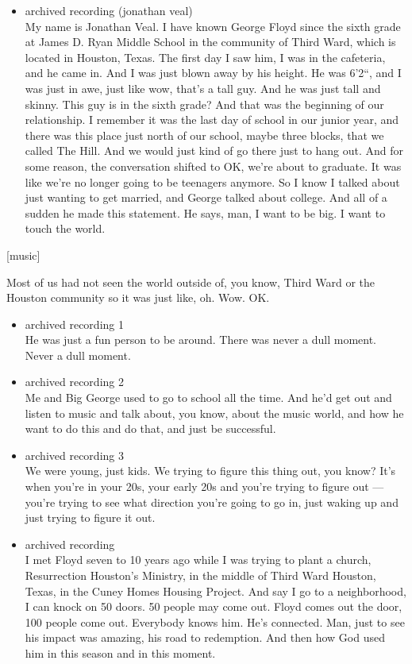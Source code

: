 \begin{itemize}
\tightlist
\item
  archived recording (jonathan veal)\\
  My name is Jonathan Veal. I have known George Floyd since the sixth
  grade at James D. Ryan Middle School in the community of Third Ward,
  which is located in Houston, Texas. The first day I saw him, I was in
  the cafeteria, and he came in. And I was just blown away by his
  height. He was 6'2``, and I was just in awe, just like wow, that's a
  tall guy. And he was just tall and skinny. This guy is in the sixth
  grade? And that was the beginning of our relationship. I remember it
  was the last day of school in our junior year, and there was this
  place just north of our school, maybe three blocks, that we called The
  Hill. And we would just kind of go there just to hang out. And for
  some reason, the conversation shifted to OK, we're about to graduate.
  It was like we're no longer going to be teenagers anymore. So I know I
  talked about just wanting to get married, and George talked about
  college. And all of a sudden he made this statement. He says, man, I
  want to be big. I want to touch the world.
\end{itemize}

{[}music{]}

Most of us had not seen the world outside of, you know, Third Ward or
the Houston community so it was just like, oh. Wow. OK.

\begin{itemize}
\item
  archived recording 1\\
  He was just a fun person to be around. There was never a dull moment.
  Never a dull moment.
\item
  archived recording 2\\
  Me and Big George used to go to school all the time. And he'd get out
  and listen to music and talk about, you know, about the music world,
  and how he want to do this and do that, and just be successful.
\item
  archived recording 3\\
  We were young, just kids. We trying to figure this thing out, you
  know? It's when you're in your 20s, your early 20s and you're trying
  to figure out --- you're trying to see what direction you're going to
  go in, just waking up and just trying to figure it out.
\item
  archived recording\\
  I met Floyd seven to 10 years ago while I was trying to plant a
  church, Resurrection Houston's Ministry, in the middle of Third Ward
  Houston, Texas, in the Cuney Homes Housing Project. And say I go to a
  neighborhood, I can knock on 50 doors. 50 people may come out. Floyd
  comes out the door, 100 people come out. Everybody knows him. He's
  connected. Man, just to see his impact was amazing, his road to
  redemption. And then how God used him in this season and in this
  moment.
\end{itemize}

